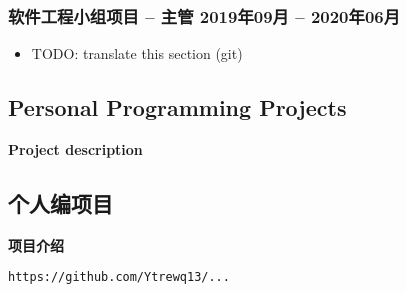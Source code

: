 \begin{xcn}
        \subsubsection{软件工程小组项目 -- 主管
        \hfill 2019年09月 -- 2020年06月}
        \begin{itemize}
            \item TODO: translate this section (git)
        \end{itemize}
\end{xcn}
\begin{xen}
    \subsection{Personal Programming Projects}
        \hspace{1em} \textbf{Project description}
\end{xen}
\begin{xcn}
    \subsection{个人编项目} %
        \hspace{1em} \textbf{项目介绍} %
\end{xcn}
        \hfill
        \texttt{https://github.com/Ytrewq13/...}
